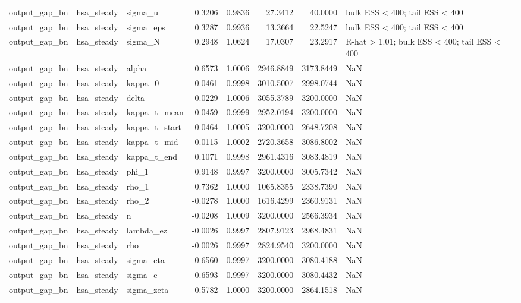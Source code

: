 \begin{tabular}{lllrrrrl}
output\_gap\_bn & hsa\_steady & sigma\_u & 0.3206 & 0.9836 & 27.3412 & 40.0000 & bulk ESS < 400; tail ESS < 400 \\
output\_gap\_bn & hsa\_steady & sigma\_eps & 0.3287 & 0.9936 & 13.3664 & 22.5247 & bulk ESS < 400; tail ESS < 400 \\
output\_gap\_bn & hsa\_steady & sigma\_N & 0.2948 & 1.0624 & 17.0307 & 23.2917 & R-hat > 1.01; bulk ESS < 400; tail ESS < 400 \\
output\_gap\_bn & hsa\_steady & alpha & 0.6573 & 1.0006 & 2946.8849 & 3173.8449 & NaN \\
output\_gap\_bn & hsa\_steady & kappa\_0 & 0.0461 & 0.9998 & 3010.5007 & 2998.0744 & NaN \\
output\_gap\_bn & hsa\_steady & delta & -0.0229 & 1.0006 & 3055.3789 & 3200.0000 & NaN \\
output\_gap\_bn & hsa\_steady & kappa\_t\_mean & 0.0459 & 0.9999 & 2952.0194 & 3200.0000 & NaN \\
output\_gap\_bn & hsa\_steady & kappa\_t\_start & 0.0464 & 1.0005 & 3200.0000 & 2648.7208 & NaN \\
output\_gap\_bn & hsa\_steady & kappa\_t\_mid & 0.0115 & 1.0002 & 2720.3658 & 3086.8002 & NaN \\
output\_gap\_bn & hsa\_steady & kappa\_t\_end & 0.1071 & 0.9998 & 2961.4316 & 3083.4819 & NaN \\
output\_gap\_bn & hsa\_steady & phi\_1 & 0.9148 & 0.9997 & 3200.0000 & 3005.7342 & NaN \\
output\_gap\_bn & hsa\_steady & rho\_1 & 0.7362 & 1.0000 & 1065.8355 & 2338.7390 & NaN \\
output\_gap\_bn & hsa\_steady & rho\_2 & -0.0278 & 1.0000 & 1616.4299 & 2360.9131 & NaN \\
output\_gap\_bn & hsa\_steady & n & -0.0208 & 1.0009 & 3200.0000 & 2566.3934 & NaN \\
output\_gap\_bn & hsa\_steady & lambda\_ez & -0.0026 & 0.9997 & 2807.9123 & 2968.4831 & NaN \\
output\_gap\_bn & hsa\_steady & rho & -0.0026 & 0.9997 & 2824.9540 & 3200.0000 & NaN \\
output\_gap\_bn & hsa\_steady & sigma\_eta & 0.6560 & 0.9997 & 3200.0000 & 3080.4188 & NaN \\
output\_gap\_bn & hsa\_steady & sigma\_e & 0.6593 & 0.9997 & 3200.0000 & 3080.4432 & NaN \\
output\_gap\_bn & hsa\_steady & sigma\_zeta & 0.5782 & 1.0000 & 3200.0000 & 2864.1518 & NaN \\

\end{tabular}
